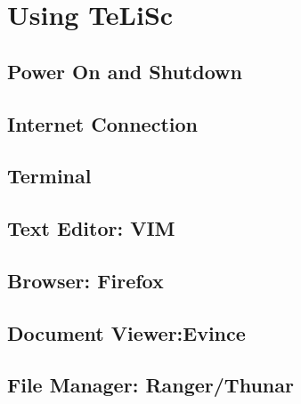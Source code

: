 
\chapter{Using TeLiSc}
\label{using}




\section{Power On and Shutdown}

\section{Internet Connection}

\section{Terminal}

\section{Text Editor: VIM}

\section{Browser: Firefox}

\section{Document Viewer:Evince}

\section{File Manager: Ranger/Thunar}
